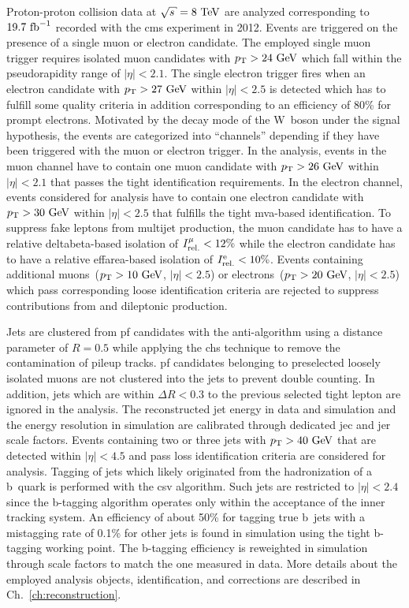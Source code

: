 Proton-proton collision data at $\sqrt{s}=8~\TeV$ are analyzed corresponding to $19.7~\mathrm{fb}^{-1}$ recorded with the \gls{cms} experiment in 2012. Events are triggered on the presence of a single muon or electron candidate. The employed single muon trigger requires isolated muon candidates with $p_\mathrm{T}>24~\mathrm{GeV}$ which fall within the pseudorapidity range of $|\eta|<2.1$. The single electron trigger fires when an electron candidate with $p_\mathrm{T}>27~\mathrm{GeV}$ within $|\eta|<2.5$ is detected which has to fulfill some quality criteria in addition corresponding to an efficiency of 80\% for prompt electrons. Motivated by the decay mode of the W~boson under the signal hypothesis, the events are categorized into ``channels'' depending if they have been triggered with the muon or electron trigger. In the analysis, events in the muon channel have to contain one muon candidate with $p_\mathrm{T}>26~\mathrm{GeV}$ within $|\eta|<2.1$ that passes the tight identification requirements. In the electron channel, events considered for analysis have to contain one electron candidate with $p_\mathrm{T}>30~\mathrm{GeV}$ within $|\eta|<2.5$ that fulfills the tight \gls{mva}-based  identification. To suppress fake leptons from multijet production, the muon candidate has to have a relative \gls{deltabeta}-based isolation of $I_\mathrm{rel.}^{\mu}<12\%$ while the electron candidate has to have a relative \gls{effarea}-based isolation of $I_\mathrm{rel.}^\mathrm{e}<10\%$. Events containing additional muons~($p_\mathrm{T}>10~\mathrm{GeV}$, $|\eta|<2.5$) or electrons~($p_\mathrm{T}>20~\mathrm{GeV}$, $|\eta|<2.5$) which pass corresponding loose identification criteria are rejected to suppress contributions from \zjets and dileptonic \ttbar production. 

Jets are clustered from \gls{pf} candidates with the anti-\kt algorithm using a distance parameter of $R=0.5$ while applying the \gls{chs} technique to remove the contamination of pileup tracks. \gls{pf} candidates belonging to preselected loosely isolated muons are not clustered into the jets to prevent double counting. In addition, jets which are within $\Delta R<0.3$ to the previous selected tight lepton are ignored in the analysis. The reconstructed jet energy in data and simulation and the energy resolution in simulation are calibrated through dedicated \gls{jec} and \gls{jer} scale factors. Events containing two or three jets with $p_\mathrm{T}>40~\mathrm{GeV}$ that are detected within $|\eta|<4.5$ and pass loss identification criteria are considered for analysis. Tagging of jets which likely originated from the hadronization of a b~quark is performed with the \gls{csv} algorithm. Such jets are restricted to $|\eta|<2.4$ since the b-tagging algorithm operates only within the acceptance of the inner tracking system. An efficiency of about 50\% for tagging true b~jets with a mistagging rate of 0.1\% for other jets is found in simulation using the tight b-tagging working point. The b-tagging efficiency is reweighted in simulation through scale factors to match the one measured in data. More details about the employed analysis objects, identification, and corrections are described in Ch.~\ref{ch:reconstruction}.

